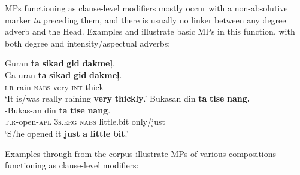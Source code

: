 MPs functioning as clause-level modifiers mostly occur with a non-absolutive marker \textit{ta} preceding them, and there is usually no linker between any degree adverb and the Head. Examples  and  illustrate basic MPs in this function, with both degree and intensity/aspectual adverbs:

\ea
\label{bkm:Ref113345573}
Guran  \textbf{ta}  \textbf{sikad} \textbf{gid}  \textbf{dakmeļ}. \\\smallskip
 \gll Ga-uran  \textbf{ta}  \textbf{sikad} \textbf{gid}  \textbf{dakmeļ}. \\
\textsc{i.r}-rain  \textsc{nabs} very  \textsc{int}  thick \\
\glt ‘It is/was really raining \textbf{very} \textbf{thickly}.’
\z
\ea
\label{bkm:Ref113345575}
Bukasan  din  \textbf{ta}  \textbf{tise}  \textbf{nang.} \\\smallskip
 \gll \emptyset{}-Bukas-an  din  \textbf{ta}  \textbf{tise}  \textbf{nang}. \\
\textsc{t.r}-open-\textsc{apl}  3\textsc{s.erg}  \textsc{nabs}  little.bit  only/just \\
\glt ‘S/he opened it \textbf{just} \textbf{a} \textbf{little} \textbf{bit}.’
\z

Examples  through  from the corpus illustrate MPs of various compositions functioning as clause-level modifiers:

